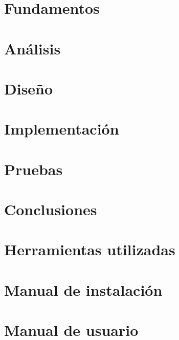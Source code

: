 \documentclass[a4paper,12pt]{scrbook}
\begin{document}
\chapter{Fundamentos}
\label{chap:fundamentos}


\chapter{Análisis}
\label{chap:analisis}


\chapter{Diseño}
\label{chap:diseno}


\chapter{Implementación}
\label{chap:implementacion}


\chapter{Pruebas}
\label{chap:pruebas}


\chapter{Conclusiones}
\label{chap:conclusiones}


\appendix

\chapter{Herramientas utilizadas}
\label{chap:herramientas}


\chapter{Manual de instalación}
\label{chap:manual_instalacion}


\chapter{Manual de usuario}
\label{chap:manual_usuario}

\end{document}
